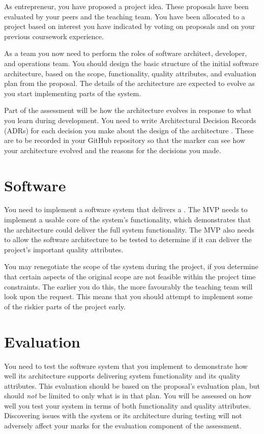 \documentclass{csse4400}
\begin{document}
As entrepreneur, you have proposed a project idea.
These proposals have been evaluated by your peers and the teaching team.
You have been allocated to a project based on interest you have indicated by voting on proposals and on your previous coursework experience.

As a team you now need to perform the roles of software architect, developer, and operations team.
You should design the basic structure of the initial software architecture,
based on the scope, functionality, quality attributes, and evaluation plan from the proposal.
The details of the architecture are expected to evolve as you start implementing parts of the system.

Part of the assessment will be how the architecture evolves in response to what you learn during development.
You need to write Architectural Decision Records (ADRs) for each decision you make about the design of the architecture \cite{adr-notes}.
These are to be recorded in your GitHub repository so that the marker can see how your architecture evolved and the reasons for the decisions you made.


\section{Software}
You need to implement a software system that delivers a .
The MVP needs to implement a usable core of the system's functionality,
which demonstrates that the architecture could deliver the full system functionality.
The MVP also needs to allow the software architecture to be tested to determine if it can deliver the project's important quality attributes.

You may renegotiate the scope of the system during the project,
if you determine that certain aspects of the original scope are not feasible within the project time constraints.
The earlier you do this, the more favourably the teaching team will look upon the request.
This means that you should attempt to implement some of the riskier parts of the project early.


\section{Evaluation}
You need to test the software system that you implement to demonstrate
how well its architecture supports delivering system functionality and its quality attributes.
This evaluation should be based on the proposal's evaluation plan, but should \emph{not} be limited to only what is in that plan.
You will be assessed on how well you test your system in terms of both functionality and quality attributes.
Discovering issues with the system or its architecture during testing will not adversely affect your marks for the evaluation component of the assessment.
\end{document}
